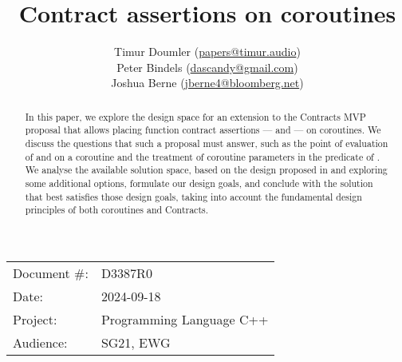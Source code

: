 

 \usepackage[bottom]{footmisc} 

 \usepackage{longtable}


\usepackage{tikz,lipsum,lmodern}
\usepackage[most]{tcolorbox}



\usepackage{titlesec}
\usepackage{tocloft}


\newcommand{\changelocaltocdepth}[1]{%
  \addtocontents{toc}{\protect\setcounter{tocdepth}{#1}}%
  \setcounter{tocdepth}{#1}%
}

\setcounter{tocdepth}{3}



\title{Contract assertions on coroutines}
\author{
Timur Doumler \small(\href{mailto:papers@timur.audio}{papers@timur.audio}) \\
Peter Bindels \small(\href{mailto:dascandy@gmail.com}{dascandy@gmail.com}) \\
Joshua Berne \small(\href{mailto:jberne4@bloomberg.net}{jberne4@bloomberg.net}) 
}
\date{}
\maketitle

\begin{tabular}{ll}
Document \#: & D3387R0 \\
Date: &2024-09-18 \\
Project: & Programming Language C++ \\
Audience: & SG21, EWG
\end{tabular}

\begin{abstract}
In this paper, we explore the design space for an extension to the Contracts MVP proposal \cite{P2900R8} that allows placing function contract assertions ---  and 
 --- on coroutines. We discuss the questions that such a proposal must answer, such as the point of evaluation of  and  on a coroutine and the treatment of coroutine parameters in the predicate of . We analyse the available solution space, based on the design proposed in \cite{P2957R1} and exploring some additional options, formulate our design goals, and conclude with the solution that best satisfies those design goals, taking into account the fundamental design principles of both coroutines and Contracts.
\end{abstract}

